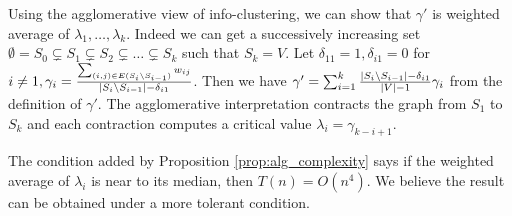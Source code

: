 \documentclass[runningheads]{llncs}
\begin{document}
\begin{remark}
		Using the agglomerative view of info-clustering, we can show that 	$\gamma'$ is weighted average of $\lambda_1, \dots, \lambda_k$. Indeed we can
		get a successively increasing set $\emptyset = S_0 \subsetneq S_1 \subsetneq S_2 \subsetneq \dots \subsetneq S_k$ such that $S_k = V$. Let $\delta_{11}=1, \delta_{i1}=0$ for $i\neq 1, \gamma_i = \frac{\sum_{(i,j) \in E(S_i\backslash S_{i-1})} w_{ij}}{\lvert S_i\backslash S_{i-1}\rvert- \delta_{i1}}$. Then we have $\gamma' = \sum_{i=1}^k \frac{\lvert S_i \backslash S_{i-1}\rvert - \delta_{i1}}{\lvert V\rvert - 1}\gamma_i$ from the definition of $\gamma'$. The agglomerative interpretation contracts the graph from $S_1$ to $S_k$ and each contraction computes a critical value $\lambda_i = \gamma_{k-i+1}$.
		
		The condition added by Proposition \ref{prop:alg_complexity} says if the weighted average of $\lambda_i$ is near to its median, then $T(n) = O(n^4)$. We believe the result can be obtained under a more tolerant condition.
\end{remark}		
\end{document}

